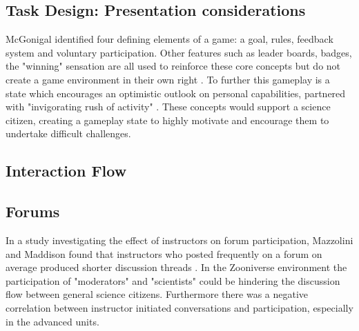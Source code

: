 \documentclass{sigchi}
\begin{document}

\subsection{Task Design: Presentation considerations}

McGonigal identified four defining elements of a game: a goal, rules, feedback system and voluntary participation. Other features such as leader boards, badges, the "winning" sensation are all used to reinforce these core concepts but do not create a game environment in their own right \cite{mcgonigal2011reality}. To further this gameplay is a state which encourages an optimistic outlook on personal capabilities, partnered with "invigorating rush of activity" \cite{mcgonigal2011reality}. These concepts would support a science citizen, creating a gameplay state to highly motivate and encourage them to undertake difficult challenges. 




\subsection{Interaction Flow}



\subsection{Forums}

In a study investigating the effect of instructors on forum participation, Mazzolini and Maddison found that instructors who posted frequently on a forum on average produced shorter discussion threads \cite{mazzolini2003sage}. In the Zooniverse environment the participation of "moderators" and "scientists" could be hindering the discussion flow between general science citizens. Furthermore there was a negative correlation between instructor initiated conversations and participation, especially in the advanced units\cite{mazzolini2003sage}. 
\end{document}
